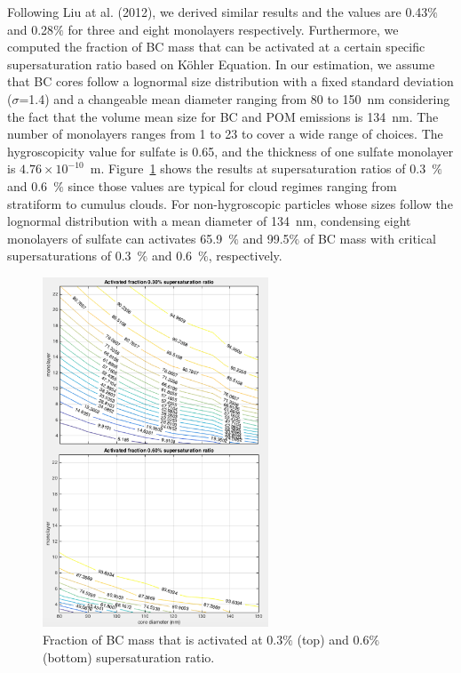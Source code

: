 \documentclass[12pt, fullpage]{uiucthesis2009_2}
\begin{document}
		Following Liu at al. (2012), we derived similar results and the values are 0.43$\%$ and 0.28$\%$ for three and eight monolayers respectively. Furthermore, we computed the fraction of BC mass that can be activated at a certain specific supersaturation ratio based on K{\" o}hler Equation. In our estimation, we assume that BC cores follow a lognormal size distribution with a fixed standard deviation ($\sigma$=1.4) and a changeable mean diameter ranging from 80 to 150~nm considering the fact that the volume mean size for BC and POM emissions is 134~nm. The number of monolayers ranges from 1 to 23 to cover a wide range of choices. The hygroscopicity value for sulfate is 0.65, and the thickness of one sulfate monolayer is $4.76 \times 10^{-10}$~m. Figure~\ref{fig_P10} shows the results at supersaturation ratios of 0.3~$\%$ and 0.6~$\%$ since those values are typical for cloud regimes ranging from stratiform to cumulus clouds. For non-hygroscopic particles whose sizes follow the lognormal distribution with a mean diameter of 134~nm, condensing eight monolayers of sulfate can activates 65.9~$\%$ and 99.5$\%$ of BC mass with critical supersaturations of 0.3~$\%$ and 0.6~$\%$, respectively.  
		
		\begin{figure}[h] 
			\begin{center}
				\includegraphics[width = 0.6\textwidth]{Figure10}
				\caption[Fraction of BC mass that is activated at 0.3$\%$ (top) and 0.6$\%$ (bottom) supersaturation ratio]{\label{fig_P10} Fraction of BC mass that is activated at 0.3$\%$ (top) and 0.6$\%$ (bottom) supersaturation ratio.}
			\end{center}
		\end{figure}
\end{document}
